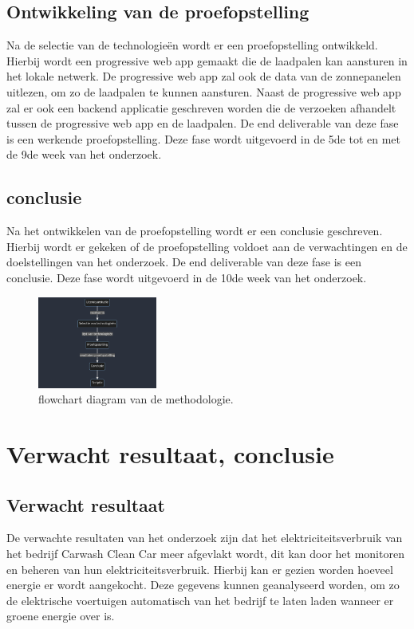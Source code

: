 \subsection{Ontwikkeling van de proefopstelling}%
\label{sub:ontwikkeling_van_de_proefopstelling}
Na de selectie van de technologieën wordt er een proefopstelling ontwikkeld. Hierbij wordt een progressive web app gemaakt die de laadpalen kan aansturen in het lokale netwerk. De progressive web app zal ook de data van de zonnepanelen uitlezen, om zo de laadpalen te kunnen aansturen. Naast de progressive web app zal er ook een backend applicatie geschreven worden die de verzoeken afhandelt tussen de progressive web app en de laadpalen. De end deliverable van deze fase is een werkende proefopstelling. Deze fase wordt uitgevoerd in de 5de tot en met de 9de week van het onderzoek.

\subsection{conclusie}%
\label{sub:conclusie_methodologie}
Na het ontwikkelen van de proefopstelling wordt er een conclusie geschreven. Hierbij wordt er gekeken of de proefopstelling voldoet aan de verwachtingen en de doelstellingen van het onderzoek. De end deliverable van deze fase is een conclusie. Deze fase wordt uitgevoerd in de 10de week van het onderzoek.


\begin{figure}[b]
  \centering
  \includegraphics[width=0.35\textwidth,height=0.35\textheight,keepaspectratio]{./graphics/mermaid-diagram.png}
  \caption{flowchart diagram van de methodologie.}
  \label{fig:flowchart}
\end{figure}

\newpage
\section{Verwacht resultaat, conclusie}%
\label{sec:verwachte_resultaten}

\subsection{Verwacht resultaat}%
\label{sub:verwacht_resultaat}
De verwachte resultaten van het onderzoek zijn dat het elektriciteitsverbruik van het bedrijf Carwash Clean Car meer afgevlakt wordt, dit kan door het monitoren en beheren van hun elektriciteitsverbruik. Hierbij kan er gezien worden hoeveel energie er wordt aangekocht. Deze gegevens kunnen geanalyseerd worden, om zo de elektrische voertuigen automatisch van het bedrijf te laten laden wanneer er groene energie over is.

